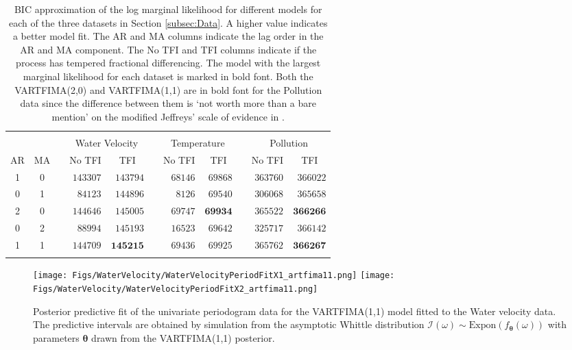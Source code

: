 \documentclass[11pt,english,oneside]{amsart}
\numberwithin{equation}{section}
\theoremstyle{plain}
\numberwithin{equation}{section}
\renewcommand{\v}[1]{\boldsymbol{#1}}
\begin{document}
\begin{table}[]
\begin{tabular}{ccrrrcrrrrr}
\hline 
 &  &  & \multicolumn{2}{c}{\vspace{-0.25cm}
} &  & \multicolumn{2}{c}{} &  & \multicolumn{2}{c}{}\tabularnewline
 &  &  & \multicolumn{2}{c}{Water Velocity} &  & \multicolumn{2}{c}{Temperature} &  & \multicolumn{2}{c}{Pollution}\tabularnewline
\cline{4-5} \cline{5-5} \cline{7-8} \cline{8-8} \cline{10-11} \cline{11-11} 
\multicolumn{1}{c}{AR} & \multicolumn{1}{c}{MA} &  & \multicolumn{1}{c}{No TFI} & \multicolumn{1}{c}{TFI} &  & \multicolumn{1}{c}{No TFI} & \multicolumn{1}{c}{TFI} &  & \multicolumn{1}{c}{No TFI} & \multicolumn{1}{c}{TFI}\tabularnewline
1 & 0 &  & $143307$ & $143794$ &  & $68146$ & $69868$ &  & $363760$ & $366022$\tabularnewline
0 & 1 &  & $84123$ & $144896$ &  & $8126$ & $69540$ &  & $306068$ & $365658$\tabularnewline
2 & 0 &  & $144646$ & $145005$ &  & $69747$ & $\textbf{69934}$ &  & $365522$ & $\textbf{366266}$\tabularnewline
0 & 2 &  & $88994$ & $145193$ &  & $16523$ & $69642$ &  & $325717$ & $366142$\tabularnewline
1 & 1 &  & $144709$ & $\textbf{145215}$ &  & $69436$ & $69925$ &  & $365762$ & $\textbf{366267}$\tabularnewline
 &  &  & \vspace{-0.35cm}
 &  &  &  &  &  &  & \tabularnewline
\hline 
\end{tabular} 
\vspace{0.1cm}
\caption{BIC approximation of the log marginal likelihood for different models for each of the three datasets in Section \ref{subsec:Data}. A higher value indicates a better model fit.  The AR and MA columns indicate the lag order in the AR and MA component. The No TFI and TFI columns indicate if the process has tempered fractional differencing. The model with the largest marginal likelihood for each dataset is marked in bold font. Both the VARTFIMA(2,0) and VARTFIMA(1,1) are in bold font for the Pollution data since the difference between them is `not worth more than a bare mention' on the modified Jeffreys' scale of evidence in \cite{kass1995bayes}.}
\label{table:BIC}
\end{table}

\begin{figure}
    \texttt{[image: Figs/WaterVelocity/WaterVelocityPeriodFitX1\_artfima11.png]}
    \texttt{[image: Figs/WaterVelocity/WaterVelocityPeriodFitX2\_artfima11.png]}
    \caption{Posterior predictive fit of the univariate periodogram data for the VARTFIMA(1,1) model fitted to the Water velocity data. The predictive intervals are obtained by simulation from the asymptotic Whittle distribution $\mathcal{I}(\omega)\sim\mathrm{Expon}(f_{\v\theta}(\omega))$ with parameters $\v\theta$ drawn from the VARTFIMA(1,1) posterior.}\label{fig:WaterVelocitySpectral}
\end{figure}
\end{document}
